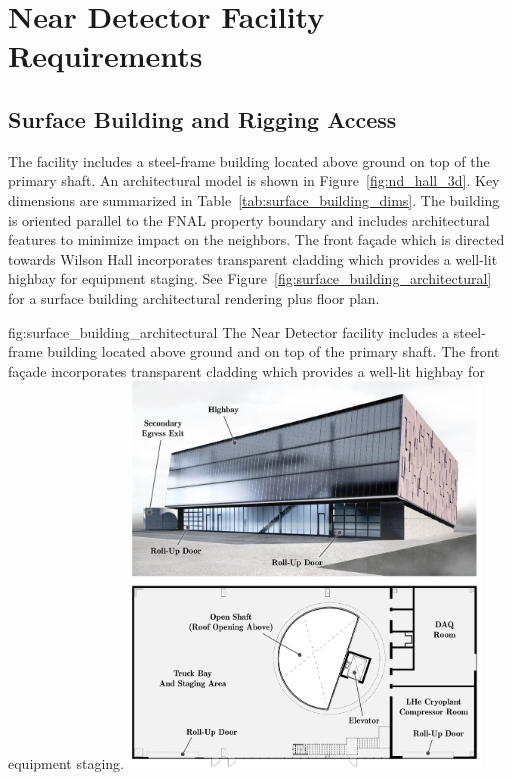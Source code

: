 \section{Near Detector Facility Requirements}
\label{sec:int-inst-fac-req}

\subsection{Surface Building and Rigging Access}
\label{sec:chap-id:facility:surface}

The  facility includes a steel-frame building located above ground on top of the primary shaft. An architectural model is shown in Figure~\ref{fig:nd_hall_3d}. Key dimensions are summarized in Table~\ref{tab:surface_building_dims}. The building is oriented parallel to the FNAL property boundary and includes architectural features to minimize impact on the neighbors. The front façade which is directed towards Wilson Hall incorporates transparent cladding which provides a well-lit highbay for equipment staging. See Figure~\ref{fig:surface_building_architectural} for a surface building architectural rendering plus floor plan.

\begin{dunefigure}{fig:surface_building_architectural}
{The Near Detector facility includes a steel-frame building located above ground and on top of the primary shaft. The front façade incorporates transparent cladding which provides a well-lit highbay for equipment staging.}
\includegraphics[width=0.7\textwidth]{graphics/i-and-i/surface_building_architectural}
\end{dunefigure}


